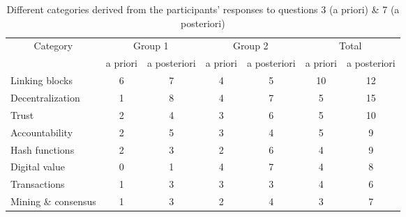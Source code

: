 \begin{table}[]
    \centering
    \begin{tabular}{l|cc|cc|cc}
    \multicolumn{1}{c}{Category}      & \multicolumn{2}{c}{Group 1} & \multicolumn{2}{c}{Group 2} & \multicolumn{2}{c}{Total} \\
          & a priori   & a posteriori  & a priori   & a posteriori   & a priori  & a posteriori  \\
        \hline
Linking blocks      &   6       &        7       &     4       &      5          &    10      &       12      \\
Decentralization    &   1       &        8       &     4       &       7         &     5      &      15       \\
Trust               &   2       &        4       &     3      &       6         &     5       &      10        \\
Accountability      &   2       &        5       &     3       &       4         &     5      &      9        \\
Hash functions      &   2       &        3        &     2       &   6         &     4         &      9       \\
Digital value       &   0       &        1       &      4      &         7       &     4      &      8        \\
Transactions        &   1       &        3       &     3       &     3        &     4         &       6      \\
Mining \& consensus &   1       &        3       &      2      &       4       &     3        &      7        \\
\end{tabular}
    \caption{Different categories derived from the participants' responses to questions 3 (a priori) \& 7 (a posteriori)}
    \label{tab:responses3+7}
\end{table}


